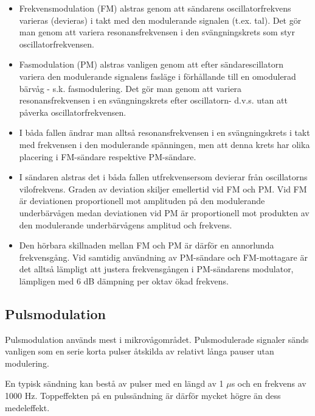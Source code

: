 \begin{itemize}

\item Frekvensmodulation (FM) alstras genom att sändarens oscillatorfrekvens
varieras (devieras) i takt med den modulerande signalen (t.ex. tal). Det gör man
genom att variera resonansfrekvensen i den svängningskrets som styr
oscillatorfrekvensen.

\item Fasmodulation (PM) alstras vanligen genom att efter sändarescillatorn
variera den modulerande signalens fasläge i förhållande till en omodulerad
bärvåg - s.k. fasmodulering. Det gör man genom att variera resonansfrekvensen i
en svängningskrets efter oscillatorn- d.v.s. utan att påverka
oscillatorfrekvensen.

\item I båda fallen ändrar man alltså resonansfrekvensen i en svängningskrets i
takt med frekvensen i den modulerande spänningen, men att denna krets har olika
placering i FM-sändare respektive PM-sändare.

\item I sändaren alstras det i båda fallen utfrekvensersom devierar från
oscillatorns vilofrekvens. Graden av deviation skiljer emellertid vid FM och PM.
Vid FM är deviationen proportionell mot amplituden på den modulerande
underbärvågen medan deviationen vid PM är proportionell mot produkten av den
modulerande underbärvågens amplitud och frekvens.

\item Den hörbara skillnaden mellan FM och PM är därför en annorlunda
frekvensgång. Vid samtidig användning av PM-sändare och FM-mottagare är det
alltså lämpligt att justera frekvensgången i PM-sändarens modulator, lämpligen
med 6 dB dämpning per oktav ökad frekvens.

\end{itemize}

\subsection{Pulsmodulation}

Pulsmodulation används mest i mikrovågområdet. Pulsmodulerade signaler sänds
vanligen som en serie korta pulser åtskilda av relativt långa pauser utan
modulering.

En typisk sändning kan bestå av pulser med en längd av 1 $\mu$s och en frekvens
av 1000 Hz. Toppeffekten på en pulssändning är därför mycket högre än dess
medeleffekt.

